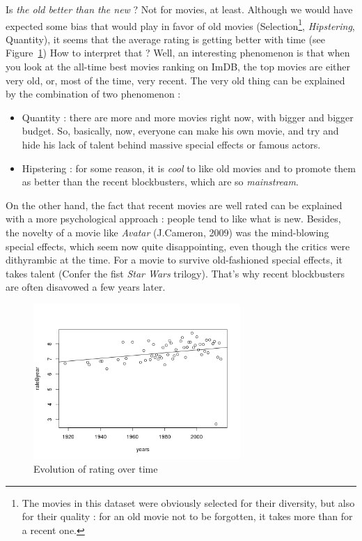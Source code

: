 Is \textit{the old better than the new} ? Not for movies, at least.
Although we would have expected some bias that would play in favor of old movies (Selection\footnote{The movies in this dataset were obviously selected for their diversity, but also for their quality : for an old movie not to be forgotten, it takes more than for a recent one.},
 \textit{Hipstering}, Quantity), it seems that the average rating is getting better with time (see Figure~\ref{fig:ratingEvolution})
How to interpret that ? Well, an interesting phenomenon is that when you look at the all-time best movies ranking on ImDB, the top movies are either very old, or, most of the time, very recent.
The very old thing can be explained by the combination of two phenomenon :
\begin{itemize}
    \item Quantity : there are more and more movies right now, with bigger and bigger budget.
    So, basically, now, everyone can make his own movie, and try and hide his lack of talent behind massive special effects or famous actors.
    \item Hipstering : for some reason, it is \textit{cool} to like old movies and to promote them as better than the recent blockbusters, which are so \textit{mainstream}.
\end{itemize}
On the other hand, the fact that recent movies are well rated can be explained with a more psychological approach : people tend to like what is new.
Besides, the novelty of a movie like \textit{Avatar} (J.Cameron, 2009) was the mind-blowing special effects, which seem now quite disappointing, even though the critics were dithyrambic at the time.
For a movie to survive old-fashioned special effects, it takes talent (Confer the fist \textit{Star Wars} trilogy).
That's why recent blockbusters are often disavowed a few years later.

\begin{figure}[!h]
\begin{center}
\includegraphics[width=0.70\textwidth]{../src/pre-processing/stats/results/ratingEvolution.png}
\end{center}
\caption{Evolution of rating over time}
\label{fig:ratingEvolution}
\end{figure}


